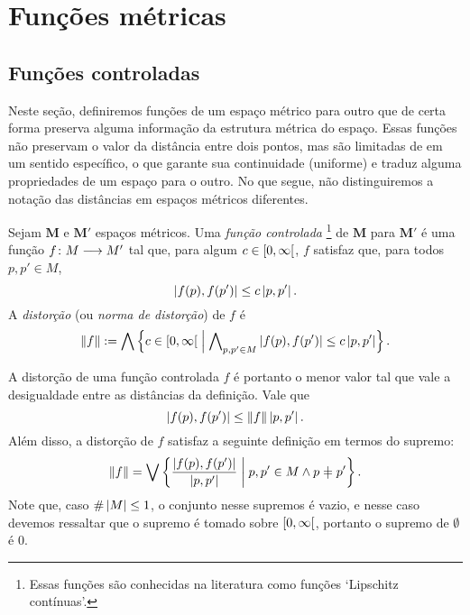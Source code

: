 \section{Funções métricas}

\subsection{Funções controladas}

Neste seção, definiremos funções de um espaço métrico para outro que de certa forma preserva alguma informação da estrutura métrica do espaço. Essas funções não preservam o valor da distância entre dois pontos, mas são limitadas de em um sentido específico, o que garante sua continuidade (uniforme) e traduz alguma propriedades de um espaço para o outro. No que segue, não distinguiremos a notação das distâncias em espaços métricos diferentes.

\begin{definition}
Sejam $\bm M$ e $\bm M'$ espaços métricos. Uma \emph{função controlada}%
	\footnote{Essas funções são conhecidas na literatura como funções `Lipschitz contínuas'.} %
de $\bm M$ para $\bm M'$ é uma função ${f}\colon {M} \longrightarrow {M'}$ tal que, para algum $c \in \left[{0},{\infty}\right[$, $f$ satisfaz que, para todos $p,p' \in M$,
	\begin{equation*}
	\left\vert{f(p)},{f(p')}\right\vert \leq c\left\vert{p},{p'}\right\vert.
	\end{equation*}
A \emph{distorção} (ou \emph{norma de distorção}) de $f$ é
	\begin{equation*}
	\left\Vert{f}\right\Vert := \bigwedge\left\{{c \in \left[{0},{\infty}\right[}\;\middle\vert\;{\bigwedge\nolimits_{p,p' \in M} \left\vert{f(p)},{f(p')}\right\vert \leq c\left\vert{p},{p'}\right\vert}\right\}.
	\end{equation*}
\end{definition}

A distorção de uma função controlada $f$ é portanto o menor valor tal que vale a desigualdade entre as distâncias da definição. Vale que
	\begin{equation*}
	\left\vert{f(p)},{f(p')}\right\vert \leq \left\Vert{f}\right\Vert\left\vert{p},{p'}\right\vert.
	\end{equation*}
Além disso, a distorção de $f$ satisfaz a seguinte definição em termos do supremo:
	\begin{equation*}
	\distor{f} = \sup \set{\frac{\dist{f(p)}{f(p')}}{\dist{p}{p'}}}{p,p' \in M \land p \neq p'}.
	\end{equation*}
Note que, caso $\#\left\lvert{M}\right\rvert \leq 1$, o conjunto nesse supremos é vazio, e nesse caso devemos ressaltar que o supremo é tomado sobre $\left[{0},{\infty}\right[$, portanto o supremo de $\emptyset$ é $0$.

